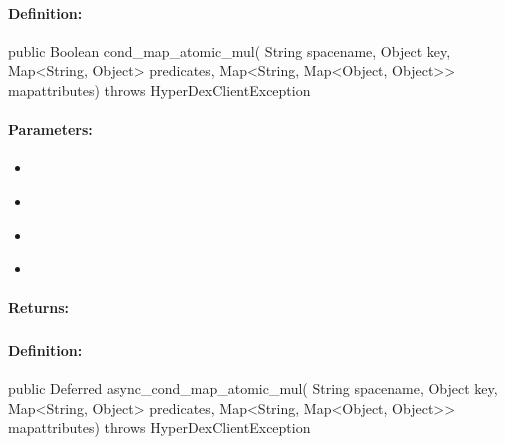 \paragraph{Definition:}
\begin{javacode}
public Boolean cond_map_atomic_mul(
        String spacename,
        Object key,
        Map<String, Object> predicates,
        Map<String, Map<Object, Object>> mapattributes) throws HyperDexClientException
\end{javacode}

\paragraph{Parameters:}
\begin{itemize}[noitemsep]
\item {}\\

\item {}\\

\item {}\\

\item {}\\

\end{itemize}

\paragraph{Returns:}


\pagebreak
\subsubsection{}
\label{api:java:async_cond_map_atomic_mul}


\paragraph{Definition:}
\begin{javacode}
public Deferred async_cond_map_atomic_mul(
        String spacename,
        Object key,
        Map<String, Object> predicates,
        Map<String, Map<Object, Object>> mapattributes) throws HyperDexClientException
\end{javacode}

